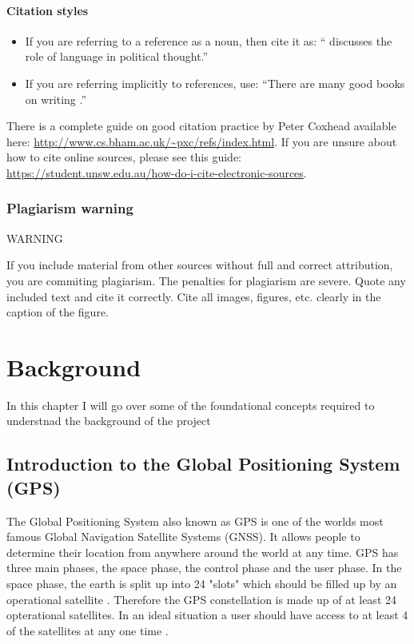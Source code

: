 \documentclass{l4proj}
\begin{document}
\subsubsection{Citation styles}

\begin{itemize}
\item If you are referring to a reference as a noun, then cite it as: ``\citet{Orw68} discusses the role of language in political thought.''
\item If you are referring implicitly to references, use: ``There are many good books on writing \citep{Orw68, Wil09, Pin15}.''
\end{itemize}

There is a complete guide on good citation practice by Peter Coxhead available here: \url{http://www.cs.bham.ac.uk/~pxc/refs/index.html}. 
If you are unsure about how to cite online sources, please see this guide: \url{https://student.unsw.edu.au/how-do-i-cite-electronic-sources}.

\subsection{Plagiarism warning}

\begin{highlight_title}{WARNING}
    
    If you include material from other sources without full and correct attribution, you are commiting plagiarism. The penalties for plagiarism are severe.
    Quote any included text and cite it correctly. Cite all images, figures, etc. clearly in the caption of the figure.
\end{highlight_title}


\chapter{Background}

In this chapter I will go over some of the foundational concepts required to understnad the background of the project

\section{Introduction to the Global Positioning System (GPS)}

The Global Positioning System also known as GPS is one of the worlds most famous Global Navigation Satellite Systems (GNSS). It allows people to determine their
location from anywhere around the world at any time. GPS has three main phases, the space phase, the control phase and the user phase.
In the space phase, the earth is split up into 24 "slots" which should be filled up by an operational satellite \citep{spsStandard}. Therefore
the GPS constellation is made up of at least 24 opterational satellites. In an ideal situation a user should have access to at least 4 of the satellites
at any one time \citep{Rabbany2006}. 
\end{document}
